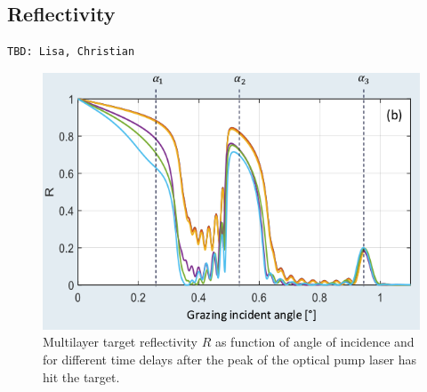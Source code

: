 \documentclass[preprint, 12pt]{elsarticle}
\begin{document}
\subsection{Reflectivity\label{sec:reflectivity}}
\begin{verbatim}
TBD: Lisa, Christian
\end{verbatim}
%
\begin{figure}[ht]
  \begin{center}
    \includegraphics[width=.8\textwidth,angle=0,clip]{figures/TaAl_reflectivity}
  \end{center}
  \caption{Multilayer target reflectivity $R$ as function of angle of incidence
    and for different time delays after the peak of the optical pump laser has hit
    the target.
  }
  \label{fig:TaAl_reflectivity}
\end{figure}
%
\lipsum[2]
%
\end{document}
